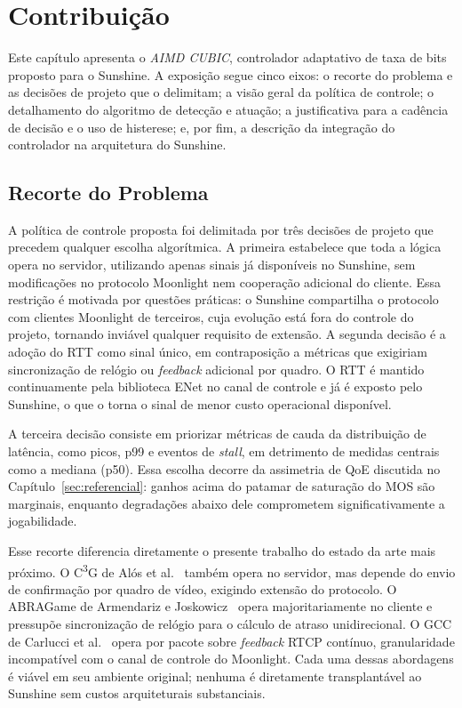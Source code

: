 
\section{Contribuição}\label{sec:contribuicao}

Este capítulo apresenta o \emph{AIMD CUBIC}, controlador
adaptativo de taxa de bits proposto para o Sunshine. A
exposição segue cinco eixos: o recorte do problema e as
decisões de projeto que o delimitam; a visão geral da política
de controle; o detalhamento do algoritmo de detecção e atuação;
a justificativa para a cadência de decisão e o uso de
histerese; e, por fim, a descrição da integração do controlador
na arquitetura do Sunshine.

\subsection{Recorte do Problema}

A política de controle proposta foi delimitada por três decisões de projeto que precedem qualquer escolha algorítmica. A primeira estabelece que toda a lógica opera no servidor, utilizando apenas sinais já disponíveis no Sunshine, sem modificações no protocolo Moonlight nem cooperação adicional do cliente. Essa restrição é motivada por questões práticas: o Sunshine compartilha o protocolo com clientes Moonlight de terceiros, cuja evolução está fora do controle do projeto, tornando inviável qualquer requisito de extensão. A segunda decisão é a adoção do RTT como sinal único, em contraposição a métricas que exigiriam sincronização de relógio ou \emph{feedback} adicional por quadro. O RTT é mantido continuamente pela biblioteca ENet no canal de controle e já é exposto pelo Sunshine, o que o torna o sinal de menor custo operacional disponível.

A terceira decisão consiste em priorizar métricas de cauda da distribuição de latência, como picos, p99 e eventos de \emph{stall}, em detrimento de medidas centrais como a mediana (p50). Essa escolha decorre da assimetria de QoE discutida no Capítulo~\ref{sec:referencial}: ganhos acima do patamar de saturação do MOS são marginais, enquanto degradações abaixo dele comprometem significativamente a jogabilidade.

Esse recorte diferencia diretamente o presente trabalho do
estado da arte mais próximo. O C\textsuperscript{3}G de Alós et
al.~\cite{alos2019} também opera no servidor, mas depende do
envio de confirmação por quadro de vídeo, exigindo extensão do
protocolo. O ABRAGame de Armendariz e
Joskowicz~\cite{abragame} opera majoritariamente no cliente e
pressupõe sincronização de relógio para o cálculo de atraso
unidirecional. O GCC de Carlucci et al.~\cite{gcc} opera por
pacote sobre \emph{feedback} RTCP contínuo, granularidade
incompatível com o canal de controle do Moonlight. Cada uma
dessas abordagens é viável em seu ambiente original; nenhuma é
diretamente transplantável ao Sunshine sem custos arquiteturais
substanciais.

